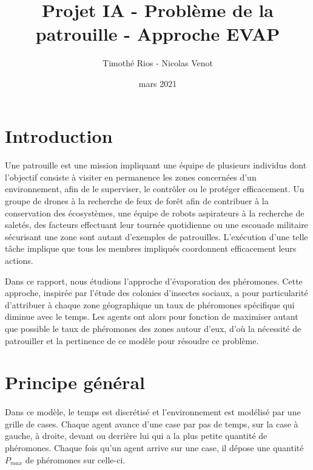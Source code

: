 \documentclass{article}
\title{Projet IA - Problème de la patrouille - Approche EVAP}
\author{Timothé Rios - Nicolas Venot}
\date{mars 2021}
\begin{document}
\maketitle
\newpage
\tableofcontents
\newpage
\setlength{\parindent}{0pt}

\section*{Introduction}
    \paragraph{}Une patrouille est une mission impliquant une équipe de plusieurs individus dont l'objectif consiste à visiter en permanence les zones concernées d'un environnement, afin de le superviser, le contrôler ou le protéger efficacement.
    Un groupe de drones à la recherche de feux de forêt afin de contribuer à la conservation des écosystèmes, une équipe de robots aspirateurs à la recherche de saletés, des facteurs effectuant leur tournée quotidienne ou une escouade militaire sécurisant une zone sont autant d'exemples de patrouilles.
    L'exécution d'une telle tâche implique que tous les membres impliqués coordonnent efficacement leurs actions.
    
    Dans ce rapport, nous étudions l'approche d'évaporation des phéromones.
    Cette approche, inspirée par l'étude des colonies d'insectes sociaux, a pour 
    particularité d'attribuer à chaque zone géographique un taux de phéromones spécifique qui diminue avec le temps.
    Les agents ont alors pour fonction de maximiser autant que possible le taux de phéromones 
    des zones autour d'eux, d'où la nécessité de patrouiller et la pertinence de ce modèle pour 
résoudre ce problème.

\section{Principe général}

    \paragraph{} Dans ce modèle, le temps est discrétisé et l'environnement est modélisé par une grille de cases. Chaque agent
    avance d'une case par pas de temps, sur la case à gauche, à droite, devant ou derrière lui qui a la plus petite quantité de 
    phéromones. Chaque fois qu'un agent arrive sur une case, il dépose une quantité $P_{max}$ de phéromones sur celle-ci. 
\end{document}
